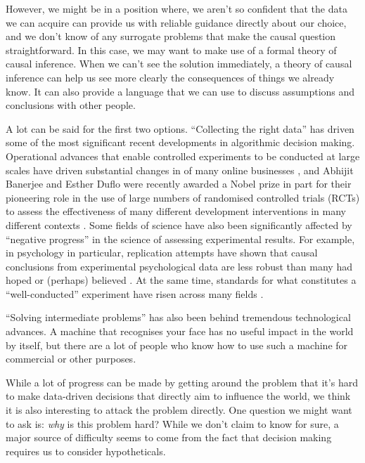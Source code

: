However, we might be in a position where, we aren't so confident that the data we can acquire can provide us with reliable guidance directly about our choice, and we don't know of any surrogate problems that make the causal question straightforward. In this case, we may want to make use of a formal theory of causal inference. When we can't see the solution immediately, a theory of causal inference can help us see more clearly the consequences of things we already know. It can also provide a language that we can use to discuss assumptions and conclusions with other people.

A lot can be said for the first two options. ``Collecting the right data'' has driven some of the most significant recent developments in algorithmic decision making. Operational advances that enable controlled experiments to be conducted at large scales have driven substantial changes in of many online businesses \citep{kohavi_surprising_2017}, and Abhijit Banerjee and Esther Duflo were recently awarded a Nobel prize in part for their pioneering role in the use of large numbers of randomised controlled trials (RCTs) to assess the effectiveness of many different development interventions in many different contexts \citep{zhang_abdul_2014}. Some fields of science have also been significantly affected by ``negative progress'' in the science of assessing experimental results. For example, in psychology in particular, replication attempts have shown that causal conclusions from experimental psychological data are less robust than many had hoped or (perhaps) believed \citep{open_science_collaboration_estimating_2015,stroebe_what_2019}. At the same time, standards for what constitutes a ``well-conducted'' experiment have risen across many fields \citep{nosek_preregistration_2018,liberati_prisma_2009}.

``Solving intermediate problems'' has also been behind tremendous technological advances. A machine that recognises your face has no useful impact in the world by itself, but there are a lot of people who know how to use such a machine for commercial or other purposes.

While a lot of progress can be made by getting around the problem that it's hard to make data-driven decisions that directly aim to influence the world, we think it is also interesting to attack the problem directly. One question we might want to ask is: \emph{why} is this problem hard? While we don't claim to know for sure, a major source of difficulty seems to come from the fact that decision making requires us to consider hypotheticals.

